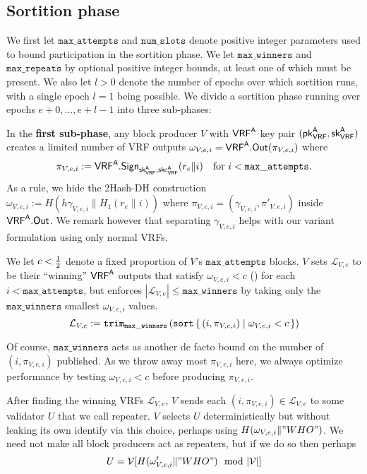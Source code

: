 \subsection{Sortition phase}\label{subsec:sortition_phase}
\newcommand{\vrfaattemptsbound}{\mathtt{max\_attempts}} %
\newcommand{\vrfawinnersbound}{\mathtt{max\_winners}} %
\newcommand{\vrfarepeatbound}{\mathtt{max\_repeats}} %
\newcommand{\vrfaslotsbound}{\mathtt{num\_slots}} %
\newcommand{\vrfwinninglist}{\ensuremath{\mathcal{L}}} %

We first let $\vrfaattemptsbound$ and $\vrfaslotsbound$ denote positive integer parameters used to bound participation in the sortition phase.  We let $\vrfawinnersbound$ and $\vrfarepeatbound$ by optional positive integer bounds, at least one of which must be present.  We also let $l>0$ denote the number of epochs over which sortition runs, with a single epoch $l=1$ being possible.  We divide a sortition phase running over epochs $e+0,\ldots,e+l-1$ into three sub-phases:  

In the {\bf first sub-phase}, any block producer $V$ with $\mathsf{VRF}^{\mathsf{A}}$ key pair $(\mathsf{pk}_{\mathsf{VRF}}^{\mathsf{A}},\mathsf{sk}_{\mathsf{VRF}}^{\mathsf{A}})$ creates a limited number of VRF outputs $\omega_{V,e,i} = \mathsf{VRF}^{\mathsf{A}}.\mathsf{Out}(\pi_{V,e,i})$ where
$$ \pi_{V,e,i} := \VRFa.\Sign_{\skvrfa,\skcvrfa}(r_e \| i) \quad \text{for $i < \vrfaattemptsbound$.} $$
As a rule, we hide the 2Hash-DH construction $\omega_{V,e,i} := H(h \gamma_{V,e,i} \| H_1(r_e \| i))$ where $\pi_{V,e,i} = (\gamma_{V,e,i},\pi'_{V,e,i})$ inside $\mathsf{VRF}^{\mathsf{A}}.\mathsf{Out}$.  We remark however that separating $\gamma_{V,e,i}$ helps with our variant formulation using only normal VRFs.  

We let $c < {1\over2}$ denote a fixed proportion of $V$'s $\vrfaattemptsbound$ blocks.  $V$ sets $\vrfwinninglist_{V,e}$ to be their ``winning'' $\mathsf{VRF}^{\mathsf{A}}$ outputs that satisfy $\omega_{V,e,i} < c$ (\dag) for each $i < \vrfaattemptsbound$, but enforces $|\vrfwinninglist_{V,e}| \le \vrfawinnersbound$ by taking only the $\vrfawinnersbound$ smallest $\omega_{V,e,i}$ values.
$$  \vrfwinninglist_{V,e} := \mathtt{trim}_\vrfawinnersbound \left( 
  \mathtt{sort} \Setst{ (i,\pi_{V,e,i}) }{ \omega_{V,e,i} < c } 
\right)  $$

Of course, $\vrfawinnersbound$ acts as another de facto bound on the number of $(i,\pi_{V,e,i})$ published.  As we throw away most $\pi_{V,e,i}$ here, we always optimize performance by testing $\omega_{V,e,i} < c$ before producing $\pi_{V,e,i}$.  

After finding the winning VRFs $\vrfwinninglist_{V,e}$,  $V$ sends each $(i,\pi_{V,e,i}) \in \vrfwinninglist_{V,e}$ to some validator $U$ that we call repeater.  $V$ selects $U$ deterministically but without leaking its own identify via this choice, perhaps using $H(\omega_{V,e,i} \| "WHO")$.  
We need not make all block producers act as repeaters, but if we do so then perhaps
$$ U = \mathcal{V}[H(\omega'_{V,e,i} \| "WHO") \mod |\mathcal{V}|] $$

